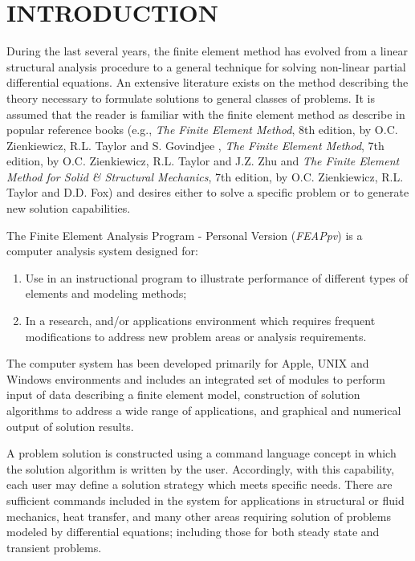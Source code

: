 \chapter[Introduction]{INTRODUCTION}
\label{intro}

During the last several years, the finite element method has evolved
from a linear structural analysis procedure to a general technique
for solving non-linear partial differential equations.  An extensive
literature exists on the method describing
the theory necessary to formulate solutions
to general classes of problems. It is
assumed that the reader is familiar with the finite element method as
describe in popular reference books (e.g.,
{\it The Finite Element Method}, 8th edition, by O.C. Zienkiewicz,
R.L. Taylor and S. Govindjee ,
{\it The Finite Element Method}, 7th edition, by O.C. Zienkiewicz, R.L. Taylor and J.Z. Zhu
and
{\it The Finite Element Method for Solid \& Structural Mechanics},
7th edition, by O.C. Zienkiewicz, R.L. Taylor and D.D. Fox) and
desires either to solve a specific problem or to generate new solution capabilities.

The Finite Element Analysis Program - Personal Version
({\sl FEAPpv}) is a computer analysis system designed for:
\begin{enumerate}
\item Use in an instructional program to illustrate performance
of different types of elements and modeling methods; 
\item In a research, and/or applications
environment which requires frequent modifications to address new
problem areas or analysis requirements.
\end{enumerate}
The computer system has been
developed primarily for Apple, UNIX and Windows environments
and includes an integrated set of modules to perform input of data describing
a finite element model, construction of solution algorithms to address a wide
range of applications, and graphical and numerical output of solution results.

A problem solution is constructed using a command
language concept in which the solution algorithm is
written by the user.  Accordingly, with this capability, each
user may define a solution strategy which meets specific needs.
There are sufficient commands included in the system for
applications in structural or fluid mechanics, heat transfer, and
many other areas requiring solution of problems modeled by differential
equations; including those
for both steady state and transient problems.

